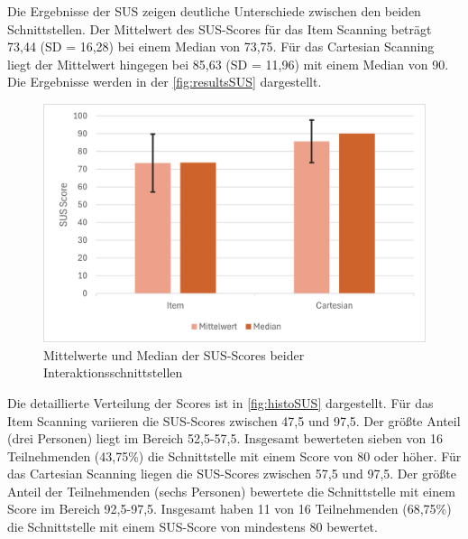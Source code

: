 Die Ergebnisse der SUS zeigen deutliche Unterschiede zwischen den beiden Schnittstellen. Der Mittelwert des SUS-Scores für das Item Scanning beträgt 73,44 (SD = 16,28) bei einem Median von 73,75. Für das Cartesian Scanning liegt der Mittelwert hingegen bei 85,63 (SD = 11,96) mit einem Median von 90. Die Ergebnisse werden in der \autoref{fig:resultsSUS} dargestellt. 

\begin{figure}[tbh]
    \centering
   \includegraphics[scale=0.75]{images/Results/SUS-Scores.png}
    \caption{Mittelwerte und Median der SUS-Scores beider Interaktionsschnittstellen}
    \label{fig:resultsSUS}
   \end{figure}

Die detaillierte Verteilung der Scores ist in \autoref{fig:histoSUS} dargestellt. Für das Item Scanning variieren die SUS-Scores zwischen 47,5 und 97,5. Der größte Anteil (drei Personen) liegt im Bereich 52,5-57,5. Insgesamt bewerteten sieben von 16 Teilnehmenden (43,75\%) die Schnittstelle mit einem Score von 80 oder höher. Für das Cartesian Scanning liegen die SUS-Scores zwischen 57,5 und 97,5. Der größte Anteil der Teilnehmenden (sechs Personen) bewertete die Schnittstelle mit einem Score im Bereich 92,5-97,5. Insgesamt haben 11 von 16 Teilnehmenden (68,75\%) die Schnittstelle mit einem SUS-Score von mindestens 80 bewertet. 

